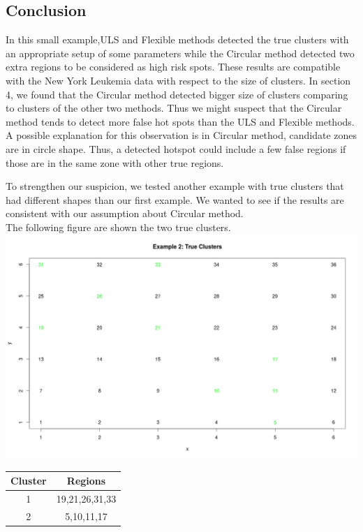 \documentclass[12pt]{article}
\begin{document}
\subsection{Conclusion}

In this small example,ULS and Flexible methods detected the true clusters with an appropriate setup of some parameters while the Circular method detected two extra regions to be considered as high risk spots. These results are compatible with the New York Leukemia data with respect to the size of clusters. In section 4, we found that the Circular method detected bigger size of clusters comparing to clusters of the other two methods. Thus we might suspect that the Circular method tends to detect more false hot spots than the ULS and Flexible methods. A possible explanation for this observation is in Circular method, candidate zones are in circle shape. Thus, a detected hotspot could include a few false regions if those are in the same zone with other true regions.  

To strengthen our suspicion, we tested another example with true clusters that had different shapes than our first example. We wanted to see if the results are consistent with our assumption about Circular method.\\ 
The following figure are shown the two true clusters.\\
\includegraphics[scale=0.2]{ex2_true}\\
\begin{tabular}{|c|c|}
	\hline
	Cluster & Regions \\
	\hline
	1 & 19,21,26,31,33 \\
	2 & 5,10,11,17 \\ \hline
\end{tabular} \\
\end{document}
